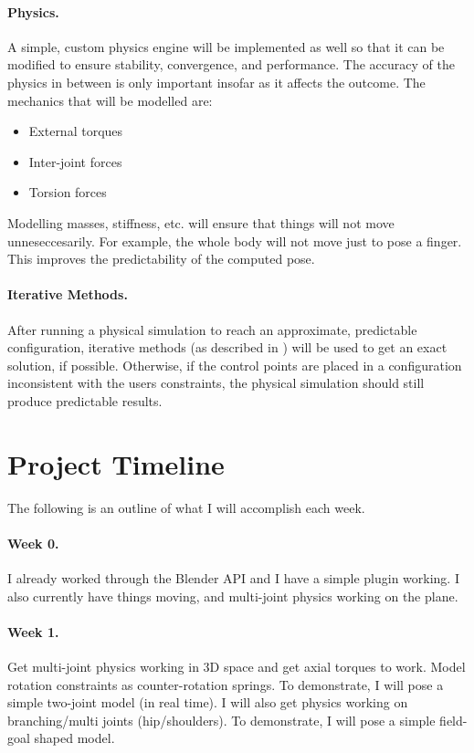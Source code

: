 \documentclass[10pt,twocolumn,letterpaper]{article}
\begin{document}
\paragraph{Physics.} A simple, custom physics engine will be implemented as well so that it can be modified to ensure stability, convergence, and performance. The accuracy of the physics in between is only important insofar as it affects the outcome. The mechanics that will be modelled are:
\begin{itemize}
    \item External torques
    \item Inter-joint forces
    \item Torsion forces
\end{itemize}
Modelling masses, stiffness, etc. will ensure that things will not move unneseccesarily. For example, the whole body will not move just to pose a finger. This improves the predictability of the computed pose.

\paragraph{Iterative Methods.} After running a physical simulation to reach an approximate, predictable configuration, iterative methods (as described in \cite{Sm}\cite{Ku}\cite{Ar}) will be used to get an exact solution, if possible. Otherwise, if the control points are placed in a configuration inconsistent with the users constraints, the physical simulation should still produce predictable results.

\section*{Project Timeline}

The following is an outline of what I will accomplish each week.

\paragraph{Week 0.} I already worked through the Blender API and I have a simple plugin working. I also currently have things moving, and multi-joint physics working on the plane.

\paragraph{Week 1.} Get multi-joint physics working in 3D space and get axial torques to work. Model rotation constraints as counter-rotation springs. To demonstrate, I will pose a simple two-joint model (in real time). I will also get physics working on branching/multi joints (hip/shoulders). To demonstrate, I will pose a simple field-goal shaped model.
\end{document}
